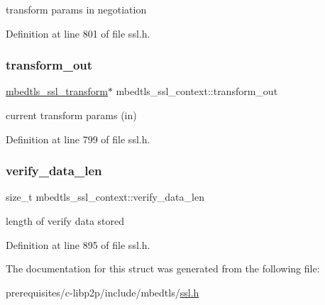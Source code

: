 transform params in negotiation 

Definition at line 801 of file ssl.\+h.

\mbox{\label{structmbedtls__ssl__context_a06e77983fa7ce4de0ffcd9ae8a038cdf}} 
\subsubsection{\texorpdfstring{transform\+\_\+out}{transform\_out}}
{\footnotesize\ttfamily \mbox{\hyperlink{structmbedtls__ssl__transform}{mbedtls\+\_\+ssl\+\_\+transform}}$\ast$ mbedtls\+\_\+ssl\+\_\+context\+::transform\+\_\+out}

current transform params (in) 

Definition at line 799 of file ssl.\+h.

\mbox{\label{structmbedtls__ssl__context_a06b667bf3672f8d480f962970c5adc7d}} 
\subsubsection{\texorpdfstring{verify\+\_\+data\+\_\+len}{verify\_data\_len}}
{\footnotesize\ttfamily size\+\_\+t mbedtls\+\_\+ssl\+\_\+context\+::verify\+\_\+data\+\_\+len}

length of verify data stored 

Definition at line 895 of file ssl.\+h.



The documentation for this struct was generated from the following file\+:\begin{DoxyCompactItemize}
\item 
prerequisites/c-\/libp2p/include/mbedtls/\mbox{\hyperlink{ssl_8h}{ssl.\+h}}\end{DoxyCompactItemize}
